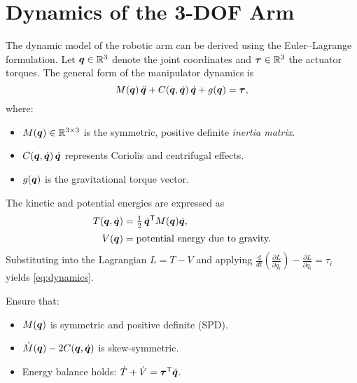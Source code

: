 ﻿%
\section{Dynamics of the 3-DOF Arm}\label{sec:dynamics}

The dynamic model of the robotic arm can be derived using the Euler--Lagrange formulation. 
Let $\bm{q} \in \mathbb{R}^3$ denote the joint coordinates and $\bm{\tau} \in \mathbb{R}^3$ the actuator torques. 
The general form of the manipulator dynamics is
\begin{equation}
  M(\bm{q})\,\ddot{\bm{q}} + C(\bm{q},\dot{\bm{q}})\,\dot{\bm{q}} + g(\bm{q}) = \bm{\tau},
  \label{eq:dynamics}
\end{equation}
where:
\begin{itemize}[leftmargin=2em]
  \item $M(\bm{q}) \in \mathbb{R}^{3\times3}$ is the symmetric, positive definite \textit{inertia matrix}.
  \item $C(\bm{q},\dot{\bm{q}})\,\dot{\bm{q}}$ represents Coriolis and centrifugal effects.
  \item $g(\bm{q})$ is the gravitational torque vector.
\end{itemize}

The kinetic and potential energies are expressed as
\begin{align}
  T(\bm{q},\dot{\bm{q}}) &= \tfrac{1}{2}\,\dot{\bm{q}}^{\mathsf{T}} M(\bm{q}) \dot{\bm{q}}, \\[3pt]
  V(\bm{q}) &= \text{potential energy due to gravity.}
\end{align}
Substituting into the Lagrangian $L = T - V$ and applying
$\frac{d}{dt}\!\left(\frac{\partial L}{\partial \dot{q}_i}\right) - \frac{\partial L}{\partial q_i} = \tau_i$
yields \eqref{eq:dynamics}.

\begin{tcolorbox}[title=Dynamic Model Validation, colback=white!98!gray]
Ensure that:
\begin{itemize}[noitemsep, topsep=2pt]
  \item $M(\bm{q})$ is symmetric and positive definite (SPD).
  \item $\dot{M}(\bm{q}) - 2C(\bm{q},\dot{\bm{q}})$ is skew-symmetric.
  \item Energy balance holds: $\dot{T} + \dot{V} = \bm{\tau}^{\mathsf{T}} \dot{\bm{q}}$.
\end{itemize}
\end{tcolorbox}
